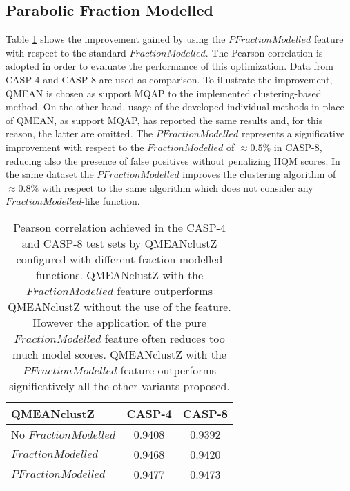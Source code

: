 \subsection{Parabolic Fraction Modelled}
\label{subsec:parabolic_fraction_modelled}
Table \ref{tab:fraction_modelled_functions} shows the improvement gained by using the $PFractionModelled$ feature with respect to the standard $FractionModelled$. The Pearson correlation is adopted in order to evaluate the performance of this optimization. Data from CASP-4 and CASP-8 are used as comparison. To illustrate the improvement, QMEAN is chosen as support MQAP to the implemented clustering-based method. On the other hand, usage of the developed individual methods in place of QMEAN, as support MQAP, has reported the same results and, for this reason, the latter are omitted. The $PFractionModelled$ represents a significative improvement with respect to the $FractionModelled$ of $\approx 0.5\%$ in CASP-8, reducing also the presence of false positives without penalizing HQM scores. In the same dataset the $PFractionModelled$ improves the clustering algorithm of $\approx 0.8\%$ with respect to the same algorithm which does not consider any $FractionModelled$-like function.
\begin{table}[H]
\center
\begin{tabular}{lcc}
\toprule                %
\textbf{QMEANclustZ}	&\textbf{CASP-4}	&\textbf{CASP-8}\\
\midrule                %
	No $FractionModelled$	&0.9408	&0.9392\\
	$FractionModelled$	&0.9468	&0.9420\\
	$PFractionModelled$	&0.9477	&0.9473\\
\bottomrule               %
\end{tabular}
\caption[Different fraction modelled evaluation]{Pearson correlation achieved in the CASP-4 and CASP-8 test sets by QMEANclustZ configured with different fraction modelled functions. QMEANclustZ with the $FractionModelled$ feature outperforms QMEANclustZ without the use of the feature. However the application of the pure $FractionModelled$ feature often reduces  too much model scores. QMEANclustZ with the $PFractionModelled$ feature outperforms significatively all the other variants proposed.}
\label{tab:fraction_modelled_functions}
\end{table}


\clearpage

